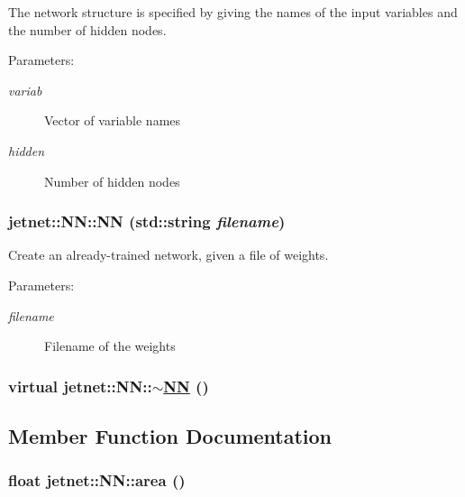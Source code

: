 The network structure is specified by giving the names of the input variables and the number of hidden nodes.\par


\begin{Desc}
\item[Parameters:]
\begin{description}
\item[{\em variab}]Vector of variable names \item[{\em hidden}]Number of hidden nodes \end{description}
\end{Desc}
\hypertarget{classjetnet_1_1NN_a3}{
\subsubsection[NN]{\setlength{\rightskip}{0pt plus 5cm}jetnet::NN::NN (std::string {\em filename})}}
\label{classjetnet_1_1NN_a3}


Create an already-trained network, given a file of weights. 

\begin{Desc}
\item[Parameters:]
\begin{description}
\item[{\em filename}]Filename of the weights \end{description}
\end{Desc}
\hypertarget{classjetnet_1_1NN_a4}{
\subsubsection[$\sim$NN]{\setlength{\rightskip}{0pt plus 5cm}virtual jetnet::NN::$\sim$\hyperlink{classjetnet_1_1NN}{NN} ()}}
\label{classjetnet_1_1NN_a4}




\subsection{Member Function Documentation}
\hypertarget{classjetnet_1_1NN_a26}{
\subsubsection[area]{\setlength{\rightskip}{0pt plus 5cm}float jetnet::NN::area ()}}
\label{classjetnet_1_1NN_a26}


